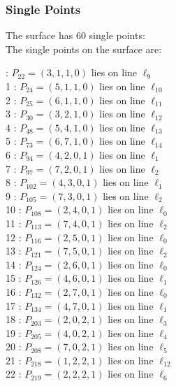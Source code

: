 \documentclass{article}
\begin{document}
{\subsubsection*{Single Points}
The surface has 60 single points:\\
The single points on the surface are:\\
\begin{multicols}{2}
 : $P_{22}=( 3, 1, 1, 0 )$ lies on line $\ell_{9}$\\
1 : $P_{24}=( 5, 1, 1, 0 )$ lies on line $\ell_{10}$\\
2 : $P_{25}=( 6, 1, 1, 0 )$ lies on line $\ell_{11}$\\
3 : $P_{30}=( 3, 2, 1, 0 )$ lies on line $\ell_{12}$\\
4 : $P_{48}=( 5, 4, 1, 0 )$ lies on line $\ell_{13}$\\
5 : $P_{73}=( 6, 7, 1, 0 )$ lies on line $\ell_{14}$\\
6 : $P_{94}=( 4, 2, 0, 1 )$ lies on line $\ell_{1}$\\
7 : $P_{97}=( 7, 2, 0, 1 )$ lies on line $\ell_{2}$\\
8 : $P_{102}=( 4, 3, 0, 1 )$ lies on line $\ell_{1}$\\
9 : $P_{105}=( 7, 3, 0, 1 )$ lies on line $\ell_{2}$\\
10 : $P_{108}=( 2, 4, 0, 1 )$ lies on line $\ell_{0}$\\
11 : $P_{113}=( 7, 4, 0, 1 )$ lies on line $\ell_{2}$\\
12 : $P_{116}=( 2, 5, 0, 1 )$ lies on line $\ell_{0}$\\
13 : $P_{121}=( 7, 5, 0, 1 )$ lies on line $\ell_{2}$\\
14 : $P_{124}=( 2, 6, 0, 1 )$ lies on line $\ell_{0}$\\
15 : $P_{126}=( 4, 6, 0, 1 )$ lies on line $\ell_{1}$\\
16 : $P_{132}=( 2, 7, 0, 1 )$ lies on line $\ell_{0}$\\
17 : $P_{134}=( 4, 7, 0, 1 )$ lies on line $\ell_{1}$\\
18 : $P_{203}=( 2, 0, 2, 1 )$ lies on line $\ell_{3}$\\
19 : $P_{205}=( 4, 0, 2, 1 )$ lies on line $\ell_{4}$\\
20 : $P_{208}=( 7, 0, 2, 1 )$ lies on line $\ell_{5}$\\
21 : $P_{218}=( 1, 2, 2, 1 )$ lies on line $\ell_{12}$\\
22 : $P_{219}=( 2, 2, 2, 1 )$ lies on line $\ell_{6}$\\

\end{multicols}}
\end{document}
